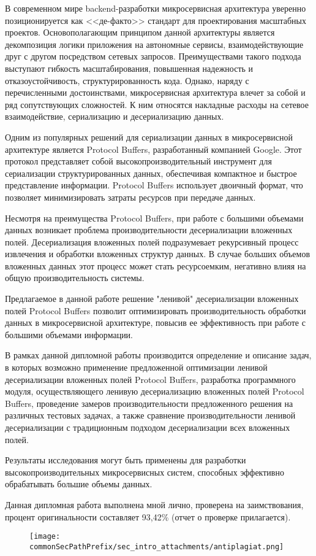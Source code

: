
В современном мире backend-разработки микросервисная архитектура уверенно позиционируется как <<де-факто>> стандарт для проектирования масштабных проектов. Основополагающим принципом данной архитектуры является декомпозиция логики приложения на автономные сервисы, взаимодействующие друг с другом посредством сетевых запросов. Преимуществами такого подхода выступают гибкость масштабирования, повышенная надежность и отказоустойчивость, структурированность кода.
Однако, наряду с перечисленными достоинствами, микросервисная архитектура влечет за собой и ряд сопутствующих сложностей. К ним относятся накладные расходы на сетевое взаимодействие, сериализацию и десериализацию данных.

Одним из популярных решений для сериализации данных в микросервисной архитектуре является Protocol Buffers, разработанный компанией Google. Этот протокол представляет собой высокопроизводительный инструмент для сериализации структурированных данных, обеспечивая компактное и быстрое представление информации. Protocol Buffers использует двоичный формат, что позволяет минимизировать затраты ресурсов при передаче данных.

Несмотря на преимущества Protocol Buffers, при работе с большими объемами данных возникает проблема производительности десериализации вложенных полей. Десериализация вложенных полей подразумевает рекурсивный процесс извлечения и обработки вложенных структур данных. В случае больших объемов вложенных данных этот процесс может стать ресурсоемким, негативно влияя на общую производительность системы.

Предлагаемое в данной работе решение "ленивой" десериализации вложенных полей Protocol Buffers позволит оптимизировать производительность обработки данных в микросервисной архитектуре, повысив ее эффективность при работе с большими объемами информации.

В рамках данной дипломной работы производится определение и описание задач, в которых возможно применение предложенной оптимизации ленивой десериализации вложенных полей Protocol Buffers, разработка программного модуля, осуществляющего ленивую десериализацию вложенных полей Protocol Buffers, проведение замеров производительности предложенного решения на различных тестовых задачах, а также сравнение производительности ленивой десериализации с традиционным подходом десериализации всех вложенных полей.

Результаты исследования могут быть применены для разработки высокопроизводительных микросервисных систем, способных эффективно обрабатывать большие объемы данных.

Данная дипломная работа выполнена мной лично, проверена на заимствования, процент оригинальности составляет 93,42\% (отчет о проверке прилагается).

\begin{figure}[ht]
    \centering
    \texttt{[image: \\commonSecPathPrefix/sec\_intro\_attachments/antiplagiat.png]}
\end{figure}
